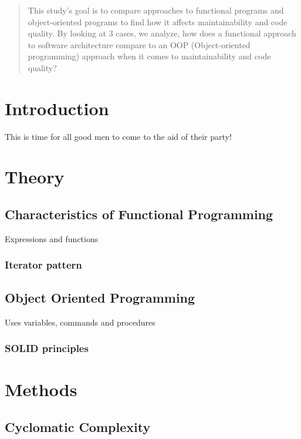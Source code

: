 \documentclass[12pt]{article}
\begin{document}
\maketitle

\begin{abstract} 

    This study's goal is to compare approaches to functional programs and
    object-oriented programs to find how it affects maintainability and code
    quality.  By looking at 3 cases, we analyze, how does a functional approach
    to software architecture compare to an OOP (Object-oriented programming)
    approach when it comes to maintainability and code quality?

\end{abstract}

\section{Introduction}
This is time for all good men to come to the aid of their party!


\section{Theory}\label{theory}
\subsection{Characteristics of Functional Programming}
Expressions and functions

\subsubsection{Iterator pattern}

\subsection{Object Oriented Programming}\label{oop}
Uses variables, commands and procedures

\subsubsection{SOLID principles}

\section{Methods}\label{methods}

\subsection{Cyclomatic Complexity}
\end{document}
